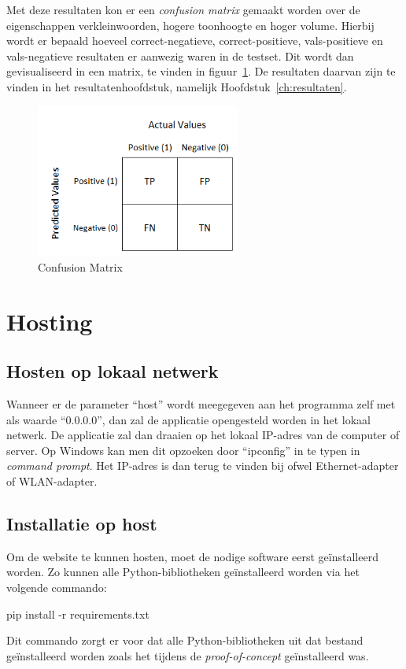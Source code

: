 Met deze resultaten kon er een \textit{confusion matrix} gemaakt worden over  de eigenschappen verkleinwoorden, hogere toonhoogte en hoger volume. Hierbij wordt er bepaald hoeveel correct-negatieve, correct-positieve, vals-positieve en vals-negatieve resultaten er aanwezig waren in de testset. Dit wordt dan gevisualiseerd in een matrix, te vinden in figuur~\ref{fig:confusion_matrix}. De resultaten daarvan zijn te vinden in het resultatenhoofdstuk, namelijk Hoofdstuk~\ref{ch:resultaten}.

\begin{figure}
    \centering
    \includegraphics[width=0.6\textwidth]{./img/confusion_matrix}
    \caption{\label{fig:confusion_matrix} Confusion Matrix~\autocite{Jain2020}}
\end{figure}

\section{Hosting}
\subsection{Hosten op lokaal netwerk}
Wanneer er de parameter ``host'' wordt meegegeven aan het programma zelf met als waarde ``0.0.0.0'', dan zal de applicatie opengesteld worden in het lokaal netwerk. De applicatie zal dan draaien op het lokaal IP-adres van de computer of server. Op Windows kan men dit opzoeken door ``ipconfig'' in te typen in \textit{command prompt}. Het IP-adres is dan terug te vinden bij ofwel Ethernet-adapter of WLAN-adapter.

\subsection{Installatie op host}
Om de website te kunnen hosten, moet de nodige software eerst geïnstalleerd worden. Zo kunnen alle Python-bibliotheken geïnstalleerd worden via het volgende commando:
\begin{python}
	pip install -r requirements.txt
\end{python}
Dit commando zorgt er voor dat alle Python-bibliotheken uit dat bestand geïnstalleerd worden zoals het tijdens de \textit{proof-of-concept} geïnstalleerd was.

